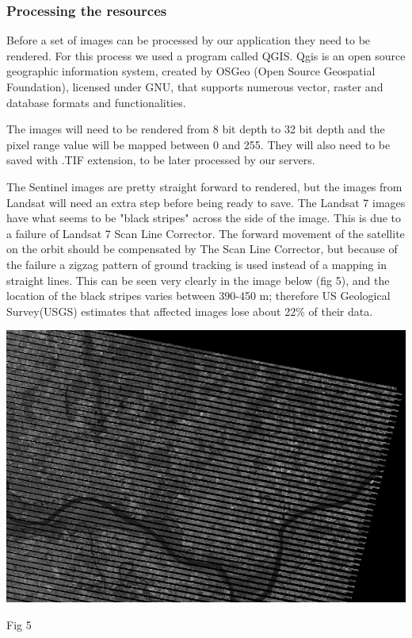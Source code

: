 \documentclass[12pt, a4paper]{report}
\begin{document}
\subsubsection{Processing the resources}

\quad
Before a set of images can be processed by our application they need to be rendered. For this process we used a program called QGIS. Qgis is an open source geographic information system, created by OSGeo (Open Source Geospatial Foundation), licensed under GNU, that supports numerous vector, raster and database formats and functionalities\cite{23}.
\par 

The images will need to be rendered from 8 bit depth to 32 bit depth and the pixel range value will be mapped between 0 and 255. They will also need to be saved with .TIF extension, to be later processed by our servers.
\par 

The Sentinel images are pretty straight forward to rendered, but the images from Landsat will need an extra step before being ready to save. The Landsat 7 images have what seems to be "black stripes" across the side of the image. This is due to a failure of Landsat 7 Scan Line Corrector. The forward movement of the satellite on the orbit should be compensated by The Scan Line Corrector, but because of the failure a zigzag pattern of ground tracking is used instead of a mapping in straight lines. This can be seen very clearly in the image below (fig 5), and the location of the black stripes varies between 390-450 m; therefore US Geological Survey(USGS) estimates that affected images lose about 22\% of their data.\cite{24}

\bigskip

\includegraphics[scale=0.54, center]{landsat_black_stripes.png} 
\begin{center}
Fig 5
\end{center}
\par 
\end{document}
